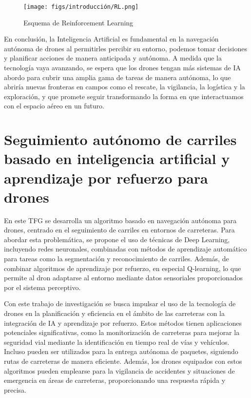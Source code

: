 \begin{figure} [H]
  \begin{center}
    \texttt{[image: figs/introducción/RL.png]}
  \end{center}
  \caption{Esquema de Reinforcement Learning \cite{BecomingHuman_RL_Basics}}
  \label{fig:Reinforcement Learning}
  \vspace{-1.5em}
\end{figure}

En conclusión, la Inteligencia Artificial es fundamental en la navegación autónoma de drones al permitirles percibir su entorno, podemos tomar decisiones y planificar acciones 
de manera anticipada y autónoma. A medida que la tecnología vaya avanzando, se espera que los drones tengan más sistemas de IA abordo para cubrir una amplia gama de tareas
de manera autónoma, lo que abriría nuevas fronteras en campos como el rescate, la vigilancia, la logística y la exploración, y que promete seguir transformando la forma en que 
interactuamos con el espacio aéreo en un futuro. 

\section{Seguimiento autónomo de carriles basado en inteligencia artificial y aprendizaje por refuerzo para drones}
\label{sec:Navegación autónoma}

En este TFG se desarrolla un algoritmo basado en navegación autónoma para drones, centrado en el seguimiento de carriles en entornos de carreteras. Para abordar esta problemática, se propone 
el uso de técnicas de Deep Learning, incluyendo redes neuronales, combinadas con métodos de aprendizaje automático para tareas como la segmentación y reconocimiento de carriles. Además, 
de combinar algoritmos de aprendizaje por refuerzo, en especial Q-learning, lo que permite al dron adaptarse al entorno mediante datos sensoriales proporcionados por el sistema perceptivo.

Con este trabajo de investigación se busca impulsar el uso de la tecnología de drones en la planificación y eficiencia en el ámbito de las carreteras con la integración 
de IA y aprendizaje por refuerzo. Estos métodos tienen aplicaciones potenciales significativas, como la monitorización de carreteras para mejorar la seguridad vial mediante la identificación en tiempo 
real de vías y vehículos. Incluso pueden ser utilizados para la entrega autónoma de paquetes, siguiendo rutas de carreteras de manera eficiente. Además, los drones equipados 
con estos algoritmos pueden emplearse para la vigilancia de accidentes y situaciones de emergencia en áreas de carreteras, proporcionando una respuesta rápida y precisa.




